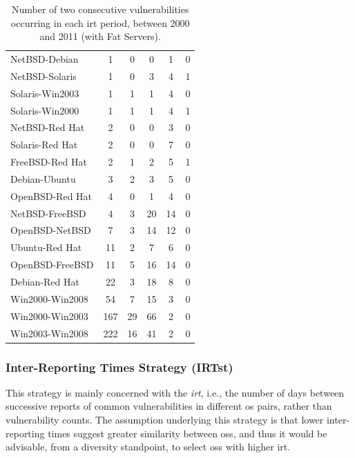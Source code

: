 \begin{table}[!ht]
\begin{center}
{\begin{tabular}{|l||c c c c c|}
NetBSD-Debian & 1 & 0 & 0 & 1 & 0 \\
NetBSD-Solaris & 1 & 0 & 3 & 4 & 1 \\
Solaris-Win2003 & 1 & 1 & 1 & 4 & 0 \\
Solaris-Win2000 & 1 & 1 & 1 & 4 & 1 \\
NetBSD-Red Hat & 2 & 0 & 0 & 3 & 0 \\
Solaris-Red Hat & 2 & 0 & 0 & 7 & 0\\
FreeBSD-Red Hat & 2 & 1 & 2 & 5 & 1\\
Debian-Ubuntu & 3 & 2 & 3 & 5 & 0\\
OpenBSD-Red Hat & 4 & 0 & 1 & 4 & 0\\
NetBSD-FreeBSD & 4 & 3 & 20 & 14 & 0 \\
OpenBSD-NetBSD & 7 & 3 & 14 & 12 & 0 \\
Ubuntu-Red Hat & 11 & 2 & 7 & 6 & 0 \\
OpenBSD-FreeBSD & 11 & 5 & 16 & 14 & 0 \\
Debian-Red Hat & 22 & 3 & 18 & 8 & 0 \\
Win2000-Win2008 & 54 & 7 & 15 & 3 & 0 \\
Win2000-Win2003 & 167 & 29 & 66 & 2 & 0 \\
Win2003-Win2008 & 222 & 16 & 41 & 2 & 0 \\ \hline
\end{tabular}
\caption{Number of two consecutive vulnerabilities occurring in each \gls{irt} period, between 2000 and 2011 (with Fat Servers).}
\label{tab:pairs_irt}
}
\end{center}
\end{table}



\subsubsection*{Inter-Reporting Times Strategy (IRTst)} \label{IRT} 
This strategy is mainly concerned with the \emph{\gls{irt}}, i.e., the number of days between successive reports of common vulnerabilities in different \gls{os} pairs, rather than vulnerability counts. 
The assumption underlying this strategy is that lower inter-reporting times suggest greater similarity between \glspl{os}, and thus it would be advisable, from a diversity standpoint, to select \glspl{os} with higher \gls{irt}.

